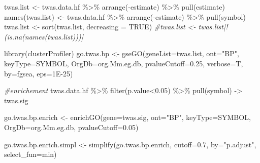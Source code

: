 \documentclass[
]{article}
\newenvironment{Shaded}{\begin{snugshade}}{\end{snugshade}}
\newcommand{\AttributeTok}[1]{\textcolor[rgb]{0.77,0.63,0.00}{#1}}
\newcommand{\CommentTok}[1]{\textcolor[rgb]{0.56,0.35,0.01}{\textit{#1}}}
\newcommand{\ConstantTok}[1]{\textcolor[rgb]{0.00,0.00,0.00}{#1}}
\newcommand{\FloatTok}[1]{\textcolor[rgb]{0.00,0.00,0.81}{#1}}
\newcommand{\FunctionTok}[1]{\textcolor[rgb]{0.00,0.00,0.00}{#1}}
\newcommand{\NormalTok}[1]{#1}
\newcommand{\OtherTok}[1]{\textcolor[rgb]{0.56,0.35,0.01}{#1}}
\newcommand{\SpecialCharTok}[1]{\textcolor[rgb]{0.00,0.00,0.00}{#1}}
\newcommand{\StringTok}[1]{\textcolor[rgb]{0.31,0.60,0.02}{#1}}
\begin{document}
\begin{Shaded}
\begin{Highlighting}[]
\NormalTok{twas.list }\OtherTok{\textless{}{-}}\NormalTok{ twas.data.hf }\SpecialCharTok{\%\textgreater{}\%} \FunctionTok{arrange}\NormalTok{(}\SpecialCharTok{{-}}\NormalTok{estimate) }\SpecialCharTok{\%\textgreater{}\%} \FunctionTok{pull}\NormalTok{(estimate)}
\FunctionTok{names}\NormalTok{(twas.list) }\OtherTok{\textless{}{-}}\NormalTok{ twas.data.hf }\SpecialCharTok{\%\textgreater{}\%} \FunctionTok{arrange}\NormalTok{(}\SpecialCharTok{{-}}\NormalTok{estimate) }\SpecialCharTok{\%\textgreater{}\%} \FunctionTok{pull}\NormalTok{(symbol)}
\NormalTok{twas.list }\OtherTok{\textless{}{-}} \FunctionTok{sort}\NormalTok{(twas.list, }\AttributeTok{decreasing =} \ConstantTok{TRUE}\NormalTok{)}
\CommentTok{\#twas.list \textless{}{-} twas.list[!(is.na(names(twas.list)))]}


\FunctionTok{library}\NormalTok{(clusterProfiler)}
\NormalTok{go.twas.bp }\OtherTok{\textless{}{-}} \FunctionTok{gseGO}\NormalTok{(}\AttributeTok{geneList=}\NormalTok{twas.list, }
               \AttributeTok{ont=}\StringTok{"BP"}\NormalTok{, }
               \AttributeTok{keyType=}\StringTok{\textquotesingle{}SYMBOL\textquotesingle{}}\NormalTok{,}
               \AttributeTok{OrgDb=}\NormalTok{org.Mm.eg.db, }
               \AttributeTok{pvalueCutoff=}\FloatTok{0.25}\NormalTok{,}
               \AttributeTok{verbose=}\NormalTok{T,}
               \AttributeTok{by=}\StringTok{\textquotesingle{}fgsea\textquotesingle{}}\NormalTok{,}
               \AttributeTok{eps=}\FloatTok{1E{-}25}\NormalTok{)}

\CommentTok{\#enrichement}
\NormalTok{twas.data.hf }\SpecialCharTok{\%\textgreater{}\%} 
  \FunctionTok{filter}\NormalTok{(p.value}\SpecialCharTok{\textless{}}\FloatTok{0.05}\NormalTok{) }\SpecialCharTok{\%\textgreater{}\%}
  \FunctionTok{pull}\NormalTok{(symbol) }\OtherTok{{-}\textgreater{}}
\NormalTok{  twas.sig}

\NormalTok{go.twas.bp.enrich }\OtherTok{\textless{}{-}} \FunctionTok{enrichGO}\NormalTok{(}\AttributeTok{gene=}\NormalTok{twas.sig, }
               \AttributeTok{ont=}\StringTok{"BP"}\NormalTok{, }
               \AttributeTok{keyType=}\StringTok{\textquotesingle{}SYMBOL\textquotesingle{}}\NormalTok{,}
               \AttributeTok{OrgDb=}\NormalTok{org.Mm.eg.db, }
               \AttributeTok{pvalueCutoff=}\FloatTok{0.05}\NormalTok{)}

\NormalTok{go.twas.bp.enrich.simpl }\OtherTok{\textless{}{-}} \FunctionTok{simplify}\NormalTok{(go.twas.bp.enrich,}
                             \AttributeTok{cutoff=}\FloatTok{0.7}\NormalTok{, }
                             \AttributeTok{by=}\StringTok{"p.adjust"}\NormalTok{,}
                             \AttributeTok{select\_fun=}\NormalTok{min)}


\end{Highlighting}
\end{Shaded}
\end{document}
